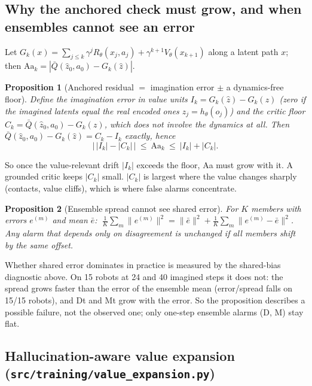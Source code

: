 \documentclass[11pt]{article}
\newtheorem{proposition}{Proposition}
\newcommand{\abs}[1]{\left|#1\right|}
\newcommand{\Qbar}{\bar Q}
\newcommand{\code}[1]{\texttt{#1}}
\begin{document}
\subsection{Why the anchored check must grow, and when ensembles cannot see an error}

Let $G_k(x)=\sum_{j\le k}\gamma^jR_\theta(x_j,a_j)+\gamma^{k+1}V_\theta(x_{k+1})$ along a latent path $x$; then
$\text{Aa}_k=\abs{\Qbar(\hat z_0,a_0)-G_k(\hat z)}$.

\begin{proposition}[Anchored residual $=$ imagination error $\pm$ a dynamics-free floor]
Define the imagination error in value units $I_k=G_k(\hat z)-G_k(z)$ (zero if the imagined latents equal the real
encoded ones $z_j=h_\theta(o_j)$) and the critic floor $C_k=\Qbar(\hat z_0,a_0)-G_k(z)$, which does not involve the
dynamics at all. Then $\Qbar(\hat z_0,a_0)-G_k(\hat z)=C_k-I_k$ exactly, hence
\[
\bigl|\,|I_k|-|C_k|\,\bigr|\ \le\ \text{Aa}_k\ \le\ |I_k|+|C_k|.
\]
\end{proposition}
\noindent So once the value-relevant drift $|I_k|$ exceeds the floor, Aa must grow with it. A grounded critic keeps
$|C_k|$ small. $|C_k|$ is largest where the value changes sharply (contacts, value cliffs), which is where false
alarms concentrate.

\begin{proposition}[Ensemble spread cannot see shared error]
For $K$ members with errors $e^{(m)}$ and mean $\bar e$:
$\ \frac1K\sum_m\|e^{(m)}\|^2=\|\bar e\|^2+\frac1K\sum_m\|e^{(m)}-\bar e\|^2$.
Any alarm that depends only on disagreement is unchanged if all members shift by the same offset.
\end{proposition}
\noindent Whether shared error dominates in practice is measured by the shared-bias diagnostic above. On 15 robots at
24 and 40 imagined steps it does not: the spread grows faster than the error of the ensemble mean (error/spread falls
on 15/15 robots), and Dt and Mt grow with the error. So the proposition describes a possible failure, not the
observed one; only one-step ensemble alarms (D, M) stay flat.

\subsection{Hallucination-aware value expansion (\code{src/training/value\_expansion.py})}
\end{document}
